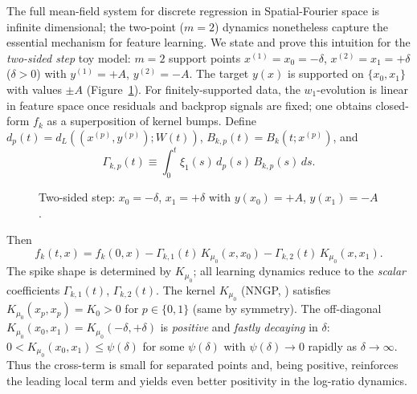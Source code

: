 \documentclass[nohyperref]{article}
\theoremstyle{plain}
\theoremstyle{definition}
\theoremstyle{remark}
\begin{document}
The full mean-field system for discrete regression in Spatial-Fourier space is infinite dimensional; the two-point ($m=2$) dynamics nonetheless capture the essential mechanism for feature learning.
We state and prove this intuition for the \emph{two-sided step} toy model: $m=2$ support points $x^{(1)}=x_0=-\delta$, $x^{(2)}=x_1=+\delta$ ($\delta>0$) with $y^{(1)}=+A$, $y^{(2)}=-A$. The target $y(x)$ is supported on $\{x_0,x_1\}$ with values $\pm A$ (Figure~\ref{fig:twostep}). For finitely-supported data, the $w_1$-evolution is linear in feature space once residuals and backprop signals are fixed; one obtains closed-form $f_k$ as a superposition of kernel bumps. Define $d_p(t)=d_L((x^{(p)},y^{(p)});W(t))$, $B_{k,p}(t)=B_k(t;x^{(p)})$, and
\[
\Gamma_{k,p}(t) \equiv \int_0^t \xi_1(s)\,d_p(s)\,B_{k,p}(s)\,ds.
\]

\begin{figure}[htbp]
\centering
{}
\caption{Two-sided step: $x_0=-\delta$, $x_1=+\delta$ with $y(x_0)=+A$, $y(x_1)=-A$.}
\label{fig:twostep}
\end{figure}
Then
\begin{equation}
\label{eq:fk-twostep}
f_k(t,x) = f_k(0,x) - \Gamma_{k,1}(t)\,K_{\mu_0}(x,x_0) - \Gamma_{k,2}(t)\,K_{\mu_0}(x,x_1).
\end{equation}
The spike shape is determined by $K_{\mu_0}$; all learning dynamics reduce to the \emph{scalar} coefficients $\Gamma_{k,1}(t)$, $\Gamma_{k,2}(t)$. The kernel $K_{\mu_0}$ (NNGP, \cite{jacot2018neural}) satisfies $K_{\mu_0}(x_p,x_p)=K_0>0$ for $p\in\{0,1\}$ (same by symmetry). The off-diagonal $K_{\mu_0}(x_0,x_1)=K_{\mu_0}(-\delta,+\delta)$ is \emph{positive} and \emph{fastly decaying} in $\delta$: $0<K_{\mu_0}(x_0,x_1)\le \psi(\delta)$ for some $\psi(\delta)$ with $\psi(\delta)\to 0$ rapidly as $\delta\to\infty$. Thus the cross-term is small for separated points and, being positive, reinforces the leading local term and yields even better positivity in the log-ratio dynamics.
\end{document}
